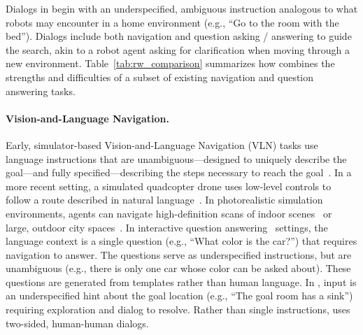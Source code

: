 
Dialogs in \dataset{} begin with an underspecified, ambiguous instruction analogous to what robots may encounter in a home environment (e.g., ``Go to the room with the bed'').
Dialogs include both navigation and question asking / answering to guide the search, akin to a robot agent asking for clarification when moving through a new environment.
Table~\ref{tab:rw_comparison} summarizes how \dataset{} combines the strengths and difficulties of a subset of existing navigation and question answering tasks.

\paragraph{Vision-and-Language Navigation.}
Early, simulator-based Vision-and-Language Navigation (VLN) tasks use language instructions that are unambiguous---designed to uniquely describe the goal---and fully specified---describing the steps necessary to reach the goal~\cite{macmahon:aaai06,chen:aaai11}.
In a more recent setting, a simulated quadcopter drone uses low-level controls to follow a route described in natural language~\cite{blukis:corl18}.
In photorealistic simulation environments, agents can navigate high-definition scans of indoor scenes~\cite{anderson:cvpr18} or large, outdoor city spaces~\cite{chen:cvpr19}.
In interactive question answering~\cite{das:cvpr18,gordon2018iqa} settings, the language context is a single question (e.g., ``What color is the car?'') that requires navigation to answer.
The questions serve as underspecified instructions, but are unambiguous (e.g., there is only one car whose color can be asked about).
These questions are generated from templates rather than human language.
In \dataset{}, input is an underspecified hint about the goal location (e.g., ``The goal room has a sink'') requiring exploration and dialog to resolve.
Rather than single instructions, \dataset{} uses two-sided, human-human dialogs.

